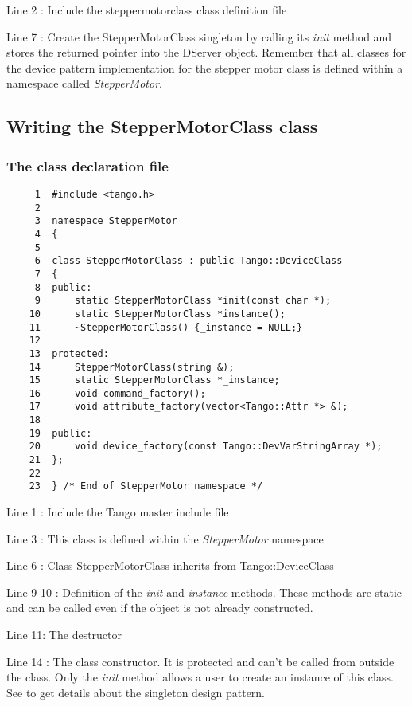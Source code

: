 Line 2 : Include the steppermotorclass class definition file

Line 7 : Create the StepperMotorClass singleton by calling its \emph{init}
method and stores the returned pointer into the DServer object. Remember
that all classes for the device pattern implementation for the stepper
motor class is defined within a namespace called
\emph{StepperMotor}.


\subsection{Writing the StepperMotorClass class}
\label{Command fact}


\subsubsection{The class declaration file}


\begin{verbatim}
     1  #include <tango.h>
     2  
     3  namespace StepperMotor
     4  {
     5  
     6  class StepperMotorClass : public Tango::DeviceClass
     7  {
     8  public:
     9      static StepperMotorClass *init(const char *);
    10      static StepperMotorClass *instance();
    11      ~StepperMotorClass() {_instance = NULL;}
    12          
    13  protected:
    14      StepperMotorClass(string &);
    15      static StepperMotorClass *_instance;
    16      void command_factory();
    17      void attribute_factory(vector<Tango::Attr *> &);
    18          
    19  public:
    20      void device_factory(const Tango::DevVarStringArray *);
    21  };
    22  
    23  } /* End of StepperMotor namespace */
\end{verbatim}


Line 1 : Include the Tango master include file

Line 3 : This class is defined within the \emph{StepperMotor} namespace

Line 6 : Class StepperMotorClass inherits from Tango::DeviceClass

Line 9-10 : Definition of the \emph{init} and \emph{instance}
methods. These methods are static and can be called even if the object
is not already constructed.

Line 11: The destructor

Line 14 : The class constructor. It is protected and can't be called
from outside the class. Only the \emph{init} method allows a user
to create an instance of this class. See \cite{Patterns} to get details
about the singleton design pattern.

